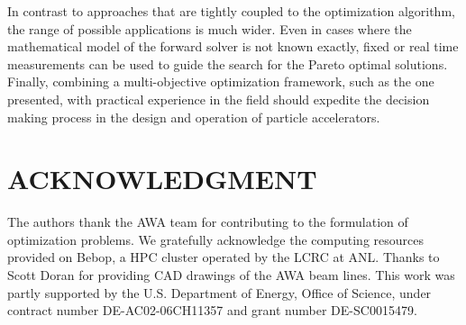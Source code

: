\documentclass[preprint,linenumbers,amsmath,amssymb,aps,prstab]{revtex4-1}%
\begin{document}
In contrast to approaches that are tightly coupled to the optimization
algorithm, the range of possible applications is much wider.
Even in cases where the mathematical model of the forward solver is not known
exactly, fixed or real time measurements can be used to guide the
search for the Pareto optimal solutions.
Finally, combining a multi-objective optimization framework, such as 
the one presented, with practical experience in the field should expedite 
the decision making process in the design and operation of particle accelerators.

 
\section{ACKNOWLEDGMENT}

The authors thank the AWA team for contributing to the
  formulation of optimization problems. 
  We gratefully acknowledge the computing resources provided on Bebop,
  a HPC cluster operated by the LCRC at ANL.
  Thanks to Scott Doran for providing CAD drawings of the AWA beam lines.
  This work was partly supported by the 
  U.S. Department of Energy, Office of Science, under 
  contract number DE-AC02-06CH11357 and grant number DE-SC0015479. 

%
\end{document}
